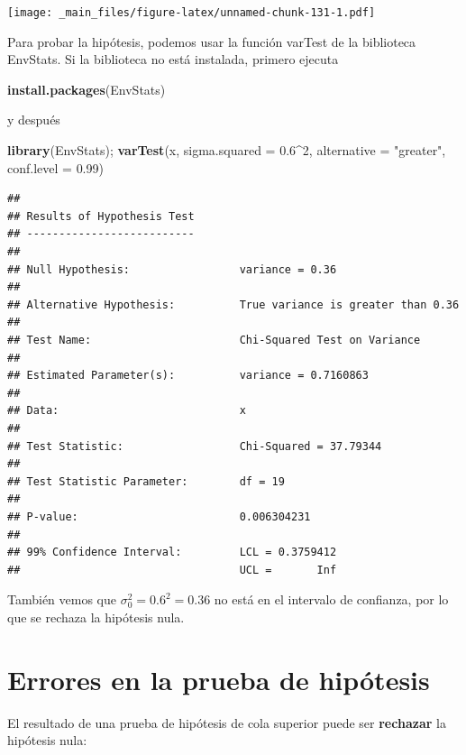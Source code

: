 \documentclass[
]{book}
\newenvironment{Shaded}{\begin{snugshade}}{\end{snugshade}}
\newcommand{\AttributeTok}[1]{\textcolor[rgb]{0.13,0.29,0.53}{#1}}
\newcommand{\DecValTok}[1]{\textcolor[rgb]{0.00,0.00,0.81}{#1}}
\newcommand{\FloatTok}[1]{\textcolor[rgb]{0.00,0.00,0.81}{#1}}
\newcommand{\FunctionTok}[1]{\textcolor[rgb]{0.13,0.29,0.53}{\textbf{#1}}}
\newcommand{\NormalTok}[1]{#1}
\newcommand{\SpecialCharTok}[1]{\textcolor[rgb]{0.81,0.36,0.00}{\textbf{#1}}}
\newcommand{\StringTok}[1]{\textcolor[rgb]{0.31,0.60,0.02}{#1}}
\begin{document}
\texttt{[image: \_main\_files/figure-latex/unnamed-chunk-131-1.pdf]}

Para probar la hipótesis, podemos usar la función varTest de la biblioteca EnvStats. Si la biblioteca no está instalada, primero ejecuta

\begin{Shaded}
\begin{Highlighting}[]
\FunctionTok{install.packages}\NormalTok{(EnvStats)}
\end{Highlighting}
\end{Shaded}

y después

\begin{Shaded}
\begin{Highlighting}[]
\FunctionTok{library}\NormalTok{(EnvStats);}
\FunctionTok{varTest}\NormalTok{(x, }\AttributeTok{sigma.squared =} \FloatTok{0.6}\SpecialCharTok{\^{}}\DecValTok{2}\NormalTok{, }\AttributeTok{alternative =} \StringTok{"greater"}\NormalTok{, }\AttributeTok{conf.level =} \FloatTok{0.99}\NormalTok{) }
\end{Highlighting}
\end{Shaded}

\begin{verbatim}
## 
## Results of Hypothesis Test
## --------------------------
## 
## Null Hypothesis:                 variance = 0.36
## 
## Alternative Hypothesis:          True variance is greater than 0.36
## 
## Test Name:                       Chi-Squared Test on Variance
## 
## Estimated Parameter(s):          variance = 0.7160863
## 
## Data:                            x
## 
## Test Statistic:                  Chi-Squared = 37.79344
## 
## Test Statistic Parameter:        df = 19
## 
## P-value:                         0.006304231
## 
## 99% Confidence Interval:         LCL = 0.3759412
##                                  UCL =       Inf
\end{verbatim}

También vemos que \(\sigma_0^2=0.6^2=0.36\) no está en el intervalo de confianza, por lo que se rechaza la hipótesis nula.

\hypertarget{errores-en-la-prueba-de-hipuxf3tesis}{%
\section{Errores en la prueba de hipótesis}\label{errores-en-la-prueba-de-hipuxf3tesis}}

El resultado de una prueba de hipótesis de cola superior puede ser \textbf{rechazar} la hipótesis nula:
\end{document}

